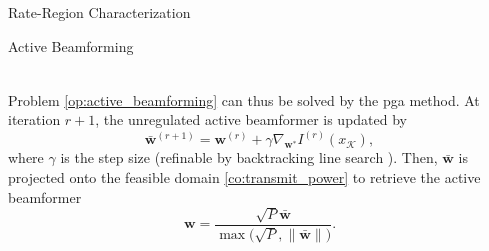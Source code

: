 \begin{section}{Rate-Region Characterization}
\begin{subsection}{Active Beamforming}
\begin{figure*}[!b]
\begin{align}
				\label{eq:weighted_sum_mutual_information_gradient}
			\end{align}
		\end{figure*}
		Problem \eqref{op:active_beamforming} can thus be solved by the \gls{pga} method.
		At iteration $r+1$, the unregulated active beamformer is updated by
		\begin{equation}
			\bar{\boldsymbol{w}}^{(r+1)} = \boldsymbol{w}^{(r)}+\gamma\nabla_{\boldsymbol{w}^*} I^{(r)}(x_{\mathcal{K}}),
			\label{eq:beamforming_gradient_ascent}
		\end{equation}
		where $\gamma$ is the step size (refinable by backtracking line search \cite[Section 9.2]{Boyd2004}).
		Then, $\bar{\boldsymbol{w}}$ is projected onto the feasible domain \eqref{co:transmit_power} to retrieve the active beamformer
		\begin{equation}
			\boldsymbol{w} = \frac{\sqrt{P} \bar{\boldsymbol{w}}}{\max\bigl(\sqrt{P},\lVert\bar{\boldsymbol{w}}\rVert\bigr)}.
			\label{eq:beamforming_projection}
		\end{equation}


\end{subsection}
\end{section}
